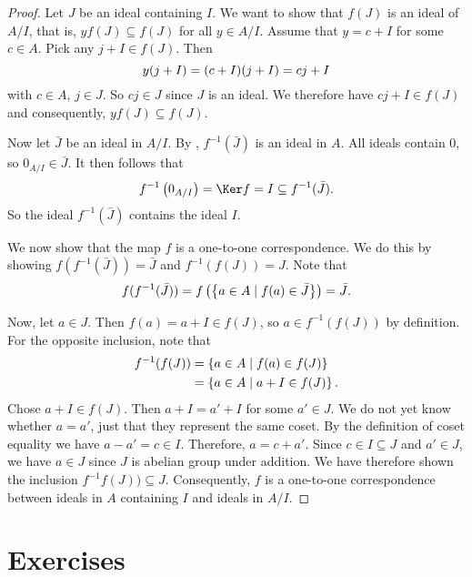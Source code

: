 \documentclass{article}
\theoremstyle{definition}
\begin{document}
\begin{proof}
	Let $J$ be an ideal containing $I$. We want to show that $f(J)$ is
	an ideal of $A / I$, that is, $yf(J) \subseteq f(J)$ for all $y
	\in A / I$. Assume that $y = c + I$ for some $c \in A$. Pick any
	$j + I \in f(J)$. Then
	\begin{equation}
		\notag
		y(j + I) = (c + I)(j + I)= cj + I
	\end{equation}
	with $c \in A$, $j \in J$. So $cj \in J$ since $J$ is an ideal. We
	therefore have $cj + I \in f(J)$ and consequently, $yf(J) \subseteq
	f(J)$.

	Now let $\bar{J}$ be an ideal in $A / I$. By , $f^{-1}(\bar{J})$ is an
	ideal in $A$. All ideals contain $0$, so $0_{A / I} \in \bar{J}$. It
	then follows that
	\begin{equation}
		\notag
		f^{-1}\left(0_{A / I}\right) = \Ker f = I \subseteq
		f^{-1}(\bar{J}).
	\end{equation}
	So the ideal $f^{-1}(\bar{J})$ contains the ideal $I$.

	We now show that the map $f$ is a one-to-one correspondence.  We do
	this by showing $f(f^{-1}(\bar{J})) = \bar{J}$ and $f^{-1}(f(J)) = J$.
	Note that
	\begin{align*}
		\notag
		f(f^{-1}(\bar{J})) = f\left(\left\{ a \in A \mid f(a) \in \bar{J} \right\} \right) = \bar{J}.
	\end{align*}

	Now, let $a \in J$. Then $f(a) = a + I \in f(J)$, so $a \in
	f^{-1}(f(J))$ by definition.
	For the opposite inclusion, note that
	\begin{align*}
		\notag
		f^{-1}(f(J)) &= \left\{ a \in A \mid f(a) \in f(J) \right\} \\
		&= \left\{ a \in A \mid a + I \in f(J) \right\}.
	\end{align*}
	Chose $a + I \in f(J)$. Then $a + I = a' + I$ for some $a' \in J$. We
	do not yet know whether $a = a'$, just that they represent the same
	coset. By the definition of coset equality we have $a - a' = c \in I$.
	Therefore, $a = c + a'$. Since $c \in I \subseteq J$ and $a' \in J$, we
	have $a \in J$ since $J$ is abelian group under addition. We have
	therefore shown the inclusion $f^{-1}f(J)) \subseteq J$.  Consequently,
	$f$ is a one-to-one correspondence between ideals in $A$ containing $I$
	and ideals in $A/I$.
\end{proof}

\section{Exercises}
\label{sec:exercises_chapter_1}
\end{document}
